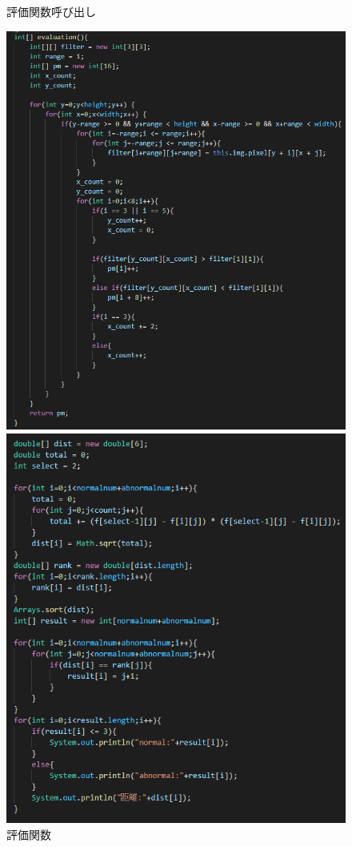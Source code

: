 \begin{figure}[htbp]
\begin{minipage}[t]{0.25\hsize}
    \centering
    \caption{評価関数呼び出し}
    \label{graph:3}
  \end{minipage}
  \begin{minipage}[t]{0.45\hsize}
    \includegraphics[scale=0.4]{評価関数.PNG}
    \centering
    \caption{評価関数}
    \label{graph:4}
  \end{minipage}
  \begin{minipage}[t]{0.45\hsize}
    \includegraphics[scale=0.4]{距離計算.PNG}

\end{minipage}
\end{figure}
